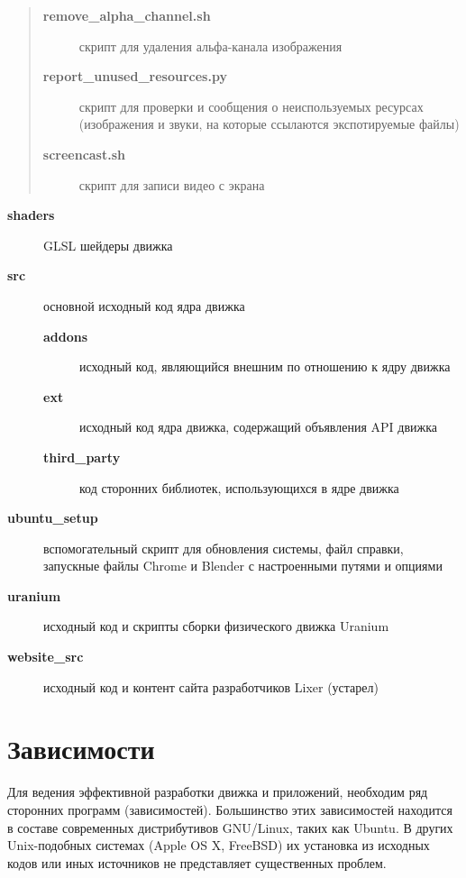 \documentclass[a4paper,12pt,oneside]{sphinxmanual}
\begin{document}
\begin{quote}
\begin{description}
\item[{\textbf{remove\_alpha\_channel.sh}}] \leavevmode
скрипт для удаления альфа-канала изображения

\item[{\textbf{report\_unused\_resources.py}}] \leavevmode
скрипт для проверки и сообщения о неиспользуемых ресурсах (изображения и
звуки, на которые ссылаются экспотируемые файлы)

\item[{\textbf{screencast.sh}}] \leavevmode
скрипт для записи видео с экрана

\end{description}
\end{quote}
\begin{description}
\item[{\textbf{shaders}}] \leavevmode
GLSL шейдеры движка

\item[{\textbf{src}}] \leavevmode
основной исходный код ядра движка
\begin{description}
\item[{\textbf{addons}}] \leavevmode
исходный код, являющийся внешним по отношению к ядру движка

\item[{\textbf{ext}}] \leavevmode
исходный код ядра движка, содержащий объявления API движка

\item[{\textbf{third\_party}}] \leavevmode
код сторонних библиотек, использующихся в ядре движка

\end{description}

\item[{\textbf{ubuntu\_setup}}] \leavevmode
вспомогательный скрипт для обновления системы, файл справки, запускные файлы Chrome и Blender с настроенными путями и опциями

\item[{\textbf{uranium}}] \leavevmode
исходный код и скрипты сборки физического движка Uranium

\item[{\textbf{website\_src}}] \leavevmode
исходный код и контент сайта разработчиков Lixer (устарел)

\end{description}


\section{Зависимости}
\label{developers:dependencies}\label{developers:id5}
Для ведения эффективной разработки движка и приложений, необходим ряд сторонних
программ (зависимостей). Большинство этих зависимостей находится в составе
современных дистрибутивов GNU/Linux, таких как Ubuntu. В других Unix-подобных
системах (Apple OS X, FreeBSD) их установка из исходных кодов или иных
источников не представляет существенных проблем.
\end{document}
